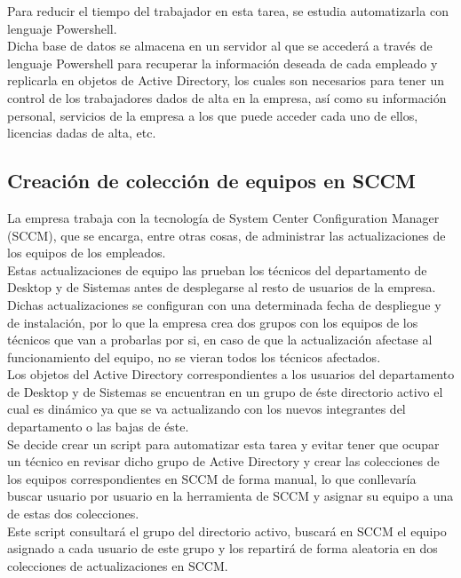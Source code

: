 \documentclass[a4paper, 12pt]{book}
\begin{document}
Para reducir el tiempo del trabajador en esta tarea, se estudia automatizarla con lenguaje Powershell.
\\

Dicha base de datos se almacena en un servidor al que se accederá a través de lenguaje Powershell para recuperar la información deseada de cada empleado y replicarla en objetos de Active Directory, los cuales son necesarios para tener un control de los trabajadores dados de alta en la empresa, así como su información personal, servicios de la empresa a los que puede acceder cada uno de ellos, licencias dadas de alta, etc.

\subsection{Creación de colección de equipos en SCCM}
\label{Creación de colección de equipos en SCCM}

La empresa trabaja con la tecnología de System Center Configuration Manager (SCCM), que se encarga, entre otras cosas, de administrar las actualizaciones de los equipos de los empleados.
\\

Estas actualizaciones de equipo las prueban los técnicos del departamento de Desktop y de Sistemas antes de desplegarse al resto de usuarios de la empresa. Dichas actualizaciones se configuran con una determinada fecha de despliegue y de instalación, por lo que la empresa crea dos grupos con los equipos de los técnicos que van a probarlas por si, en caso de que la actualización afectase al funcionamiento del equipo, no se vieran todos los técnicos afectados.
\\

Los objetos del Active Directory correspondientes a los usuarios del departamento de Desktop y de Sistemas se encuentran en un grupo de éste directorio activo el cual es dinámico ya que se va actualizando con los nuevos integrantes del departamento o las bajas de éste.
\\

Se decide crear un script para automatizar esta tarea y evitar tener que ocupar un técnico en revisar dicho grupo de Active Directory y crear las colecciones de los equipos correspondientes en SCCM de forma manual, lo que conllevaría buscar usuario por usuario en la herramienta de SCCM y asignar su equipo a una de estas dos colecciones.
\\

Este script consultará el grupo del directorio activo, buscará en SCCM el equipo asignado a cada usuario de este grupo y los repartirá de forma aleatoria en dos colecciones de actualizaciones en SCCM.
\end{document}
